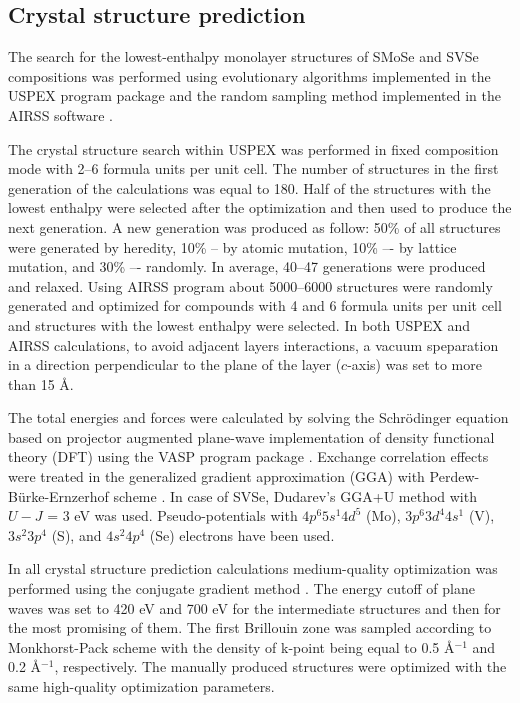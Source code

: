 \documentclass[a4paperm]{article}
\begin{document}
\subsection*{Crystal structure prediction}

The search for the lowest-enthalpy monolayer structures of SMoSe and SVSe compositions was performed using evolutionary algorithms implemented in the USPEX program package \cite{uspex1,uspex2,uspex3} and the random sampling method implemented in the AIRSS software \cite{airss1,airss2}.

The crystal structure search within USPEX was performed in fixed composition mode with 2--6 formula units per unit cell.
The number of structures in the first generation of the calculations was equal to 180.
Half of the structures with the lowest enthalpy were selected after the optimization and then used to produce the next generation.
A new generation was produced as follow: 50\% of all structures were generated by heredity, 10\% -- by atomic mutation, 10\% –- by lattice mutation, and 30\% –- randomly.
In average, 40--47 generations were produced and relaxed.
Using AIRSS program about 5000--6000 structures were randomly generated and optimized for compounds with 4 and 6 formula units per unit cell and structures with the lowest enthalpy were selected. 
In both USPEX and AIRSS calculations, to avoid adjacent layers interactions, a vacuum speparation in a direction perpendicular to the plane of the layer ($c$-axis) was set to more than 15 \AA.
 
The total energies and forces were calculated by solving the Schr\"{o}dinger equation based on projector augmented plane-wave implementation \cite{blochl1994projector} of density functional theory (DFT) using the VASP program package \cite{vasp1,vasp2}.
Exchange correlation effects were treated in the generalized gradient approximation (GGA) with Perdew-B\"{u}rke-Ernzerhof scheme \cite{pbe}.
In case of SVSe, Dudarev’s GGA+U method \cite{gga+u} with $U-J$ = 3 eV was used.
Pseudo-potentials with $4p^6 5s^1 4d^5$ (Mo), $3p^6 3d^4 4s^1$ (V), $3s^2 3p^4$ (S), and $4s^2 4p^4$ (Se) electrons have been used.

In all crystal structure prediction calculations medium-quality optimization was performed using the conjugate gradient method \cite{conjugate_gradient}. 
The energy cutoff of plane waves was set to 420 eV and 700 eV for the intermediate structures and then for the most promising of them. 
The first Brillouin zone was sampled according to Monkhorst-Pack scheme \cite{monkhorst1976special} with the density of k-point being equal to 0.5 \AA$^{-1}$ and 0.2 \AA$^{-1}$, respectively. 
The manually produced structures were optimized with the same high-quality optimization parameters.
\end{document}
